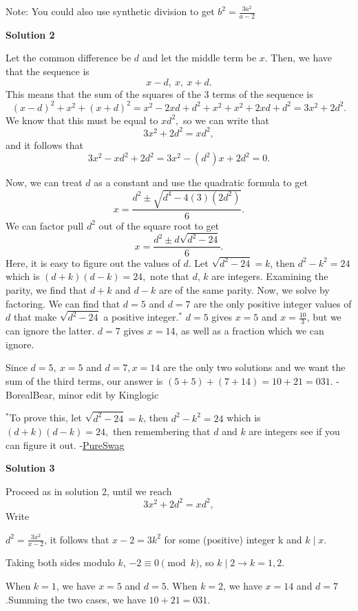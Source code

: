 \begin{enumerate}
 Note: You could also use synthetic division to get $b^2=\frac{3a^2}{a-2}$




\textbf{Solution 2}

Let the common difference be $d$ and let the middle term be $x$. Then, we have that the sequence is
 \[x-d,~x,~x+d.\]This means that the sum of the squares of the 3 terms of the sequence is 
 \[(x-d)^2+x^2+(x+d)^2=x^2-2xd+d^2+x^2+x^2+2xd+d^2=3x^2+2d^2.\]We know that this must be equal to $xd^2,$ so we can write that
 \[3x^2+2d^2=xd^2,\]and it follows that
 \[3x^2-xd^2+2d^2=3x^2-\left(d^2\right)x+2d^2=0.\]

 Now, we can treat $d$ as a constant and use the quadratic formula to get
 \[x=\frac{d^2\pm \sqrt{d^4-4(3)(2d^2)}}{6}.\]We can factor pull $d^2$ out of the square root to get
 \[x=\frac{d^2\pm d\sqrt{d^2-24}}{6}.\]Here, it is easy to figure out the values of $d$. Let $\sqrt{d^2-24} = k$, then $d^2-k^2=24$ which is $(d+k)(d-k)=24,$ note that $d$, $k$ are integers. Examining the parity, we find that $d+k$ and $d-k$ are of the same parity. Now, we solve by factoring. We can find that $d=5$ and $d=7$ are the only positive integer values of $d$ that make $\sqrt{d^2-24}$ a positive integer.$^{*}$ $d=5$ gives $x=5$ and $x=\frac{10}{3}$, but we can ignore the latter. $d=7$ gives $x=14$, as well as a fraction which we can ignore. 

 Since $d=5,~x=5$ and $d=7, x=14$ are the only two solutions and we want the sum of the third terms, our answer is $(5+5)+(7+14)=10+21=\boxed{031}$. -BorealBear, minor edit by Kinglogic

 
$^*$To prove this, let $\sqrt{d^2-24} = k$, then $d^2-k^2=24$ which is $(d+k)(d-k)=24,$ then remembering that $d$ and $k$ are integers see if you can figure it out. -\href{https://artofproblemsolving.com/wiki/index.php?title=User:PureSwag}{PureSwag}

 



\textbf{Solution 3}

Proceed as in solution 2, until we reach 
 \[3x^2+2d^2=xd^2,\] Write 

 $d^2=\frac{3x^2}{x-2}$, it follows that $x-2=3k^2$ for some (positive) integer k and $k \mid x$.

 Taking both sides modulo $k$, $-2 \equiv 0 \pmod{k}$, so $k \mid 2 \rightarrow k=1,2$. 

 When $k=1$, we have $x=5$ and $d=5$. When $k=2$, we have $x=14$ and $d=7$.Summing the two cases, we have $10+21=\boxed{031}$.


\end{enumerate}
